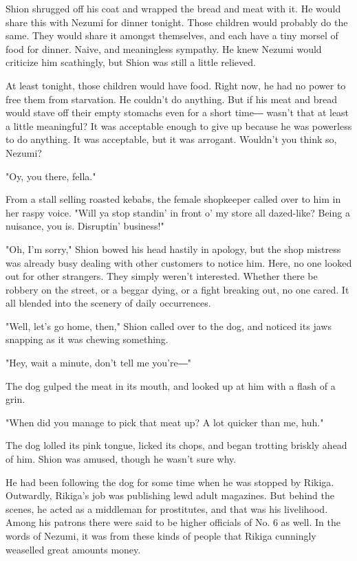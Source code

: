Shion shrugged off his coat and wrapped the bread and meat with it. He
would share this with Nezumi for dinner tonight. Those children would
probably do the same. They would share it amongst themselves, and each
have a tiny morsel of food for dinner. Naive, and meaningless sympathy.
He knew Nezumi would criticize him scathingly, but Shion was still a
little relieved.

At least tonight, those children would have food. Right now, he had no
power to free them from starvation. He couldn't do anything. But if his
meat and bread would stave off their empty stomachs even for a short
time― wasn't that at least a little meaningful? It was acceptable enough
to give up because he was powerless to do anything. It was acceptable,
but it was arrogant. Wouldn't you think so, Nezumi?

"Oy, you there, fella."

From a stall selling roasted kebabs, the female shopkeeper called over
to him in her raspy voice. "Will ya stop standin' in front o' my store
all dazed-like? Being a nuisance, you is. Disruptin' business!"

"Oh, I'm sorry," Shion bowed his head hastily in apology, but the shop
mistress was already busy dealing with other customers to notice him.
Here, no one looked out for other strangers. They simply weren't
interested. Whether there be robbery on the street, or a beggar dying,
or a fight breaking out, no one cared. It all blended into the scenery
of daily occurrences.

"Well, let's go home, then," Shion called over to the dog, and noticed
its jaws snapping as it was chewing something.

"Hey, wait a minute, don't tell me you're―"

The dog gulped the meat in its mouth, and looked up at him with a flash
of a grin.

"When did you manage to pick that meat up? A lot quicker than me, huh."

The dog lolled its pink tongue, licked its chops, and began trotting
briskly ahead of him. Shion was amused, though he wasn't sure why.

He had been following the dog for some time when he was stopped by
Rikiga. Outwardly, Rikiga's job was publishing lewd adult magazines. But
behind the scenes, he acted as a middleman for prostitutes, and that was
his livelihood. Among his patrons there were said to be higher officials
of No. 6 as well. In the words of Nezumi, it was from these kinds of
people that Rikiga cunningly weaselled great amounts money.

